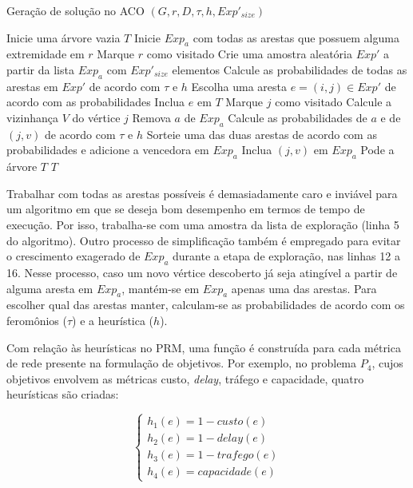 \begin{algorithm}
	\caption{Geração de solução no ACO $(G, r, D, \tau, h, Exp'_{size})$}
	\label{alg_aco_prm_construir_solucao}
	\begin{algorithmic}[1]
		\State Inicie uma árvore vazia $T$
		\State Inicie $Exp_a$ com todas as arestas que possuem alguma extremidade em $r$
		\State Marque $r$ como visitado
		\State Crie uma amostra aleatória $Exp'$ a partir da lista $Exp_a$ com $Exp'_{size}$ elementos
		\State Calcule as probabilidades de todas as arestas em $Exp'$ de acordo com $\tau$ e $h$
		\State Escolha uma aresta $e=(i,j) \in Exp'$ de acordo com as probabilidades
		\State Inclua $e$ em $T$
		\State Marque $j$ como visitado
		\State Calcule a vizinhança $V$ do vértice $j$
		\State Remova $a$ de $Exp_a$
		\State Calcule as probabilidades de $a$ e de $(j, v)$ de acordo com $\tau$ e $h$
		\State Sorteie uma das duas arestas de acordo com as probabilidades e adicione a vencedora em $Exp_a$
		\State Inclua $(j, v)$ em $Exp_a$
		\EndIf
		\EndFor
		\EndWhile
		\State Pode a árvore $T$
		\State \Return $T$
	\end{algorithmic}
\end{algorithm}

Trabalhar com todas as arestas possíveis é demasiadamente caro e inviável para um algoritmo em que se deseja bom desempenho em termos de tempo de execução. Por isso, trabalha-se com uma amostra da lista de exploração (linha 5 do algoritmo). Outro processo de simplificação também é empregado para evitar o crescimento exagerado de $Exp_a$ durante a etapa de exploração, nas linhas 12 a 16. Nesse processo, caso um novo vértice descoberto já seja atingível a partir de alguma aresta em $Exp_a$, mantém-se em $Exp_a$ apenas uma das arestas. Para escolher qual das arestas manter, calculam-se as probabilidades de acordo com os feromônios ($\tau$) e a heurística ($h$).

Com relação às heurísticas no PRM, uma função é construída para cada métrica de rede presente na formulação de objetivos. Por exemplo, no problema $P_4$, cujos objetivos envolvem as métricas custo, \textit{delay}, tráfego e capacidade, quatro heurísticas são criadas:

\[ \begin{cases} 
h_1(e) = 1 - custo(e) \\
h_2(e) = 1 - delay(e) \\
h_3(e) = 1 - trafego(e) \\
h_4(e) = capacidade(e)
\end{cases}
\]

